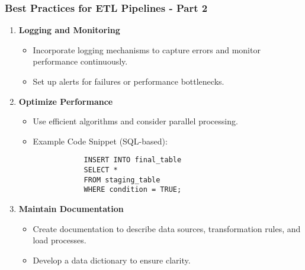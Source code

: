 \documentclass[aspectratio=169]{beamer}
\begin{document}
\begin{frame}[fragile]
    \frametitle{Best Practices for ETL Pipelines - Part 2}
    \begin{enumerate}[resume]
        \item \textbf{Logging and Monitoring}
        \begin{itemize}
            \item Incorporate logging mechanisms to capture errors and monitor performance continuously.
            \item Set up alerts for failures or performance bottlenecks.
        \end{itemize}

        \item \textbf{Optimize Performance}
        \begin{itemize}
            \item Use efficient algorithms and consider parallel processing.
            \item Example Code Snippet (SQL-based):
            \begin{lstlisting}
            INSERT INTO final_table 
            SELECT * 
            FROM staging_table 
            WHERE condition = TRUE;
            \end{lstlisting}
        \end{itemize}

        \item \textbf{Maintain Documentation}
        \begin{itemize}
            \item Create documentation to describe data sources, transformation rules, and load processes.
            \item Develop a data dictionary to ensure clarity.
        \end{itemize}
    \end{enumerate}
\end{frame}
\end{document}
